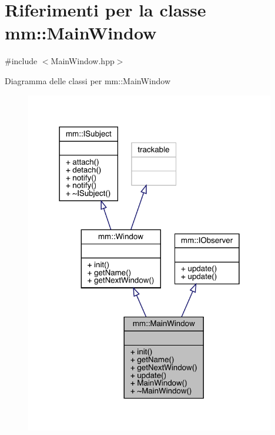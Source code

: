\hypertarget{classmm_1_1_main_window}{}\section{Riferimenti per la classe mm\+:\+:Main\+Window}
\label{classmm_1_1_main_window}


{\ttfamily \#include $<$Main\+Window.\+hpp$>$}



Diagramma delle classi per mm\+:\+:Main\+Window
\nopagebreak
\begin{figure}[H]
\begin{center}
\leavevmode
\includegraphics[width=309pt]{da/d0e/classmm_1_1_main_window__inherit__graph}
\end{center}
\end{figure}


